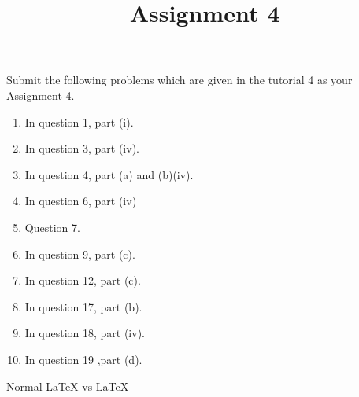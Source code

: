 \documentclass[12pt,a4paper]{article}
\title{Assignment 4}
\begin{document}
\maketitle
Submit the following problems which are given in the tutorial 4 as your Assignment 4.
\begin{enumerate}
\item In question 1, part (i).
\item In question 3, part (iv).
\item In question 4, part (a) and (b)(iv).
\item In question 6, part (iv)
\item Question 7.
\item In question 9, part (c).
\item In question 12, part (c).
\item In question 17, part (b).
\item In question 18, part (iv).
\item In question 19 ,part (d).
\end{enumerate}
 Normal LaTeX vs \LaTeX
\end{document}
